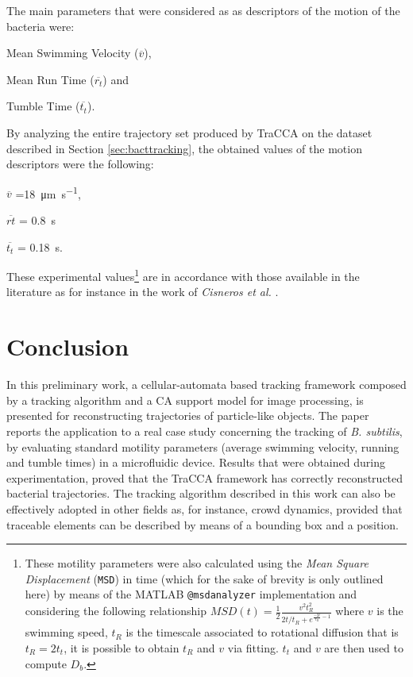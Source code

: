\documentclass[conference]{IEEEtran}
\begin{document}
The main parameters that were considered as as descriptors of the motion of the bacteria were: 
\begin{inparadesc}
\item[Mean Swimming Velocity] ($\overline{v}$),
\item[Mean Run Time] ($\overline{r_t}$) and 
\item[Tumble Time] ($\overline{t_t}$).
\end{inparadesc}
By analyzing the entire trajectory set produced by TraCCA on the dataset described in Section \ref{sec:bacttracking}, the obtained values of the motion descriptors  were the following: \begin{inparadesc}
\item[$\overline{v}$] =\SI{18}{\micro\meter \per \second},
\item[$\overline{rt}$] = \SI{0.8}{\second}
\item[$\overline{t_t}$]= \SI{0.18}{\second}.
\end{inparadesc}
These experimental values\footnote{These motility parameters were also calculated using the \textit{Mean Square Displacement} (\texttt{MSD}) in time (which for the sake of brevity is only outlined here) by means of the MATLAB \texttt{@msdanalyzer} implementation \cite{msdanalyzer} and considering the following relationship $MSD(t)=\frac{1}{2}\frac{v^2 t_R^2}{2t/t_R +e^{\frac{-2t}{t_R}-1}}$ \cite{Howse2007} where $v$ is the swimming speed, $t_R$ is the timescale associated to rotational diffusion that is $t_R=2t_t$, it is possible to obtain $t_R $ and $v$ via fitting. $t_t$ and $v$ are then used to compute $D_b$.} are in accordance with those available in the literature as for instance in the work of \textit{Cisneros et al.} \cite{Cisneros:2011}.


\section{Conclusion}\label{conclusions}
In this preliminary work, a cellular-automata based tracking framework composed by a tracking algorithm and a CA support model for image processing, is presented for reconstructing trajectories of particle-like objects. The paper reports the application to a real case study concerning the tracking of \textit{B. subtilis}, by evaluating  standard motility parameters (average swimming velocity, running and tumble times) in a microfluidic device. Results that were obtained during experimentation, proved that the TraCCA framework has correctly reconstructed bacterial trajectories. The tracking algorithm described in this work can also be effectively adopted in other fields as, for instance, crowd dynamics, provided that traceable elements can be described by means of a bounding box and a position.
\end{document}
